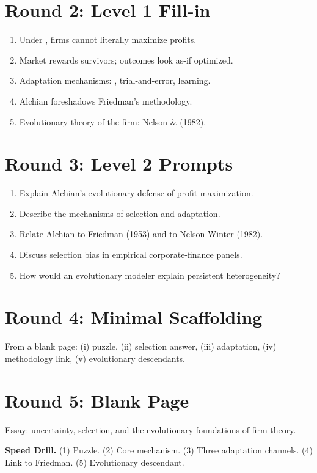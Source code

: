 \documentclass[11pt]{article}
\newcommand{\blank}[1]{\underline{\hspace{#1}}}
\begin{document}
\section*{Round 2: Level 1 Fill-in}
\begin{enumerate}
\item Under \blank{2cm}, firms cannot literally maximize profits.
\item Market \blank{2cm} rewards survivors; outcomes look as-if optimized.
\item Adaptation mechanisms: \blank{2cm}, trial-and-error, learning.
\item Alchian foreshadows Friedman's \blank{2cm} methodology.
\item Evolutionary theory of the firm: Nelson \& \blank{2cm} (1982).
\end{enumerate}

\section*{Round 3: Level 2 Prompts}
\begin{enumerate}
\item Explain Alchian's evolutionary defense of profit maximization.
\item Describe the mechanisms of selection and adaptation.
\item Relate Alchian to Friedman (1953) and to Nelson-Winter (1982).
\item Discuss selection bias in empirical corporate-finance panels.
\item How would an evolutionary modeler explain persistent heterogeneity?
\end{enumerate}

\section*{Round 4: Minimal Scaffolding}
From a blank page: (i) puzzle, (ii) selection answer, (iii) adaptation, (iv) methodology link, (v) evolutionary descendants.

\section*{Round 5: Blank Page}
Essay: uncertainty, selection, and the evolutionary foundations of firm theory.

\vspace{6pt}
\begin{drillbox}
\textbf{Speed Drill.} (1) Puzzle. (2) Core mechanism. (3) Three adaptation channels. (4) Link to Friedman. (5) Evolutionary descendant.
\end{drillbox}
\end{document}

